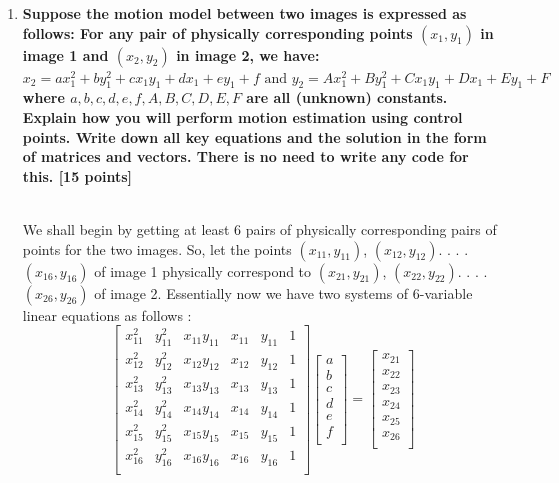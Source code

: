 \documentclass{article}
\begin{document}
\begin{enumerate}
\newpage
\item \textbf{Suppose the motion model between two images is expressed as follows: For any pair of physically corresponding points $(x_1,y_1)$ in image 1 and $(x_2, y_2)$ in image 2, we have: $x_2 = ax^2_1 + by^2_1 + c x_1 y_1 + d x_1 + e y_1 + f \text{ and } y_2 = Ax^2_1 + By^2_1 + C x_1 y_1 + D x_1 + E y_1 + F$ where $a,b,c,d,e,f,A,B,C,D,E,F$ are all (unknown) constants. Explain how you will perform motion estimation using control points. Write down all key equations and the solution in the form of matrices and vectors. There is no need to write any code for this.
\textsf{[15 points]}}
\\

\\ We shall begin by getting at least 6 pairs of physically corresponding pairs of points for the two images. So, let the points $(x_{11},y_{11})$, $(x_{12},y_{12})$. . . . $(x_{16},y_{16})$ of image 1 physically correspond to $(x_{21},y_{21})$, $(x_{22},y_{22})$. . . . $(x_{26},y_{26})$ of image 2. Essentially now we have two systems of 6-variable linear equations as follows : 
\begin{equation}
     \begin{bmatrix}
        x_{11}^2 & y_{11}^2 & x_{11}y_{11} & x_{11} & y_{11} & 1\\
        x_{12}^2 & y_{12}^2 & x_{12}y_{12} & x_{12} & y_{12} & 1\\
        x_{13}^2 & y_{13}^2 & x_{13}y_{13} & x_{13} & y_{13} & 1\\
        x_{14}^2 & y_{14}^2 & x_{14}y_{14} & x_{14} & y_{14} & 1\\
        x_{15}^2 & y_{15}^2 & x_{15}y_{15} & x_{15} & y_{15} & 1\\
        x_{16}^2 & y_{16}^2 & x_{16}y_{16} & x_{16} & y_{16} & 1\\
    \end{bmatrix}
    \begin{bmatrix}
    a \\
    b \\
    c \\
    d \\
    e \\
    f \\
    \end{bmatrix}
          =
    \begin{bmatrix}
    x_{21} \\
    x_{22} \\
    x_{23} \\
    x_{24} \\
    x_{25} \\
    x_{26} \\
    \end{bmatrix}
\end{equation}


\end{enumerate}
\end{document}

